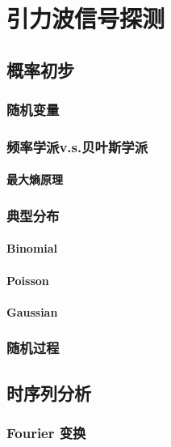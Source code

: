 
\chapter{引力波信号探测}
\label{chap6}


\section{概率初步}
\subsection{随机变量}
\subsection{频率学派v.s.贝叶斯学派}
\subsubsection{最大熵原理}
\subsection{典型分布}
\subsubsection{Binomial}
\subsubsection{Poisson}
\subsubsection{Gaussian}
\subsection{随机过程}

\section{时序列分析}
\subsection{Fourier 变换}
